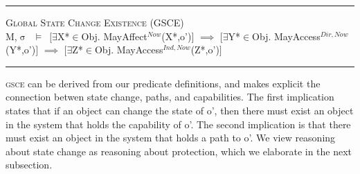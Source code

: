 \documentclass[a4paper,11pt, twoside,twocolumn]{article}
\newenvironment{logic}[1][]
{\begin{flushleft} \small }
{\end{flushleft}}
\newcommand{\loin}{$\in$}
\newcommand{\loexists}{$\exists$}
\newcommand{\loimplies}{$\implies$}
\newcommand{\losigma}{$\upsigma$}
\newcommand{\loturns} {$\vDash$}
\newcommand{\ablock} {\null\qquad}
\begin{document}
\begin{logic}
\hrule\null
\textsc{\normalsize *Global State Change Existence (GSCE)}\\
M,\losigma\ \loturns\ $[$\loexists X*\loin{Obj}. MayAffect$^{Now}$(X*,o')$]$\linebreak
\ablock \loimplies \linebreak
\ablock $[$\loexists Y*\loin{Obj}. MayAccess$^{Dir,Now}$(Y*,o')$]$\linebreak
\ablock \loimplies \linebreak
\ablock $[$\loexists Z*\loin{Obj}. MayAccess$^{Ind,Now}$(Z*,o')$]$
\linebreak\\
\hrule
\end{logic}
\textsc{gsce} can be derived from our predicate definitions, and makes explicit the connection betwen state change, paths, and capabilities. The first implication states that if an object can change the state of o', then there must exist an object in the system that holds the capability of o'. The second implication is that there must exist an object in the system that holds a path to o'.
We view reasoning about state change as reasoning about protection, which we elaborate in the next subsection.
\end{document}

